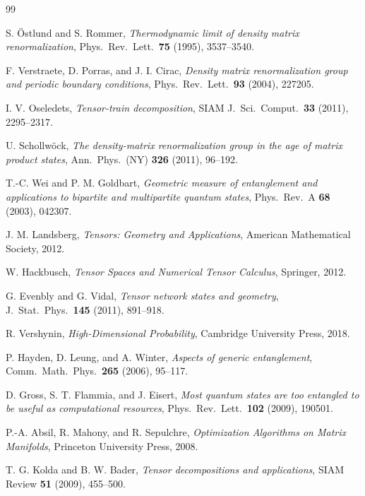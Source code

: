 \documentclass[11pt,letterpaper]{article}
\theoremstyle{definition}
\begin{document}
\begin{thebibliography}{99}

S. \"Ostlund and S. Rommer,
\emph{Thermodynamic limit of density matrix renormalization},
Phys.\ Rev.\ Lett.\ \textbf{75} (1995), 3537--3540.

F. Verstraete, D. Porras, and J. I. Cirac,
\emph{Density matrix renormalization group and periodic boundary conditions},
Phys.\ Rev.\ Lett.\ \textbf{93} (2004), 227205.

I. V. Oseledets,
\emph{Tensor-train decomposition},
SIAM J.\ Sci.\ Comput.\ \textbf{33} (2011), 2295--2317.

U. Schollw\"ock,
\emph{The density-matrix renormalization group in the age of matrix product
states},
Ann.\ Phys.\ (NY) \textbf{326} (2011), 96--192.

T.-C. Wei and P. M. Goldbart,
\emph{Geometric measure of entanglement and applications to bipartite and
multipartite quantum states},
Phys.\ Rev.\ A \textbf{68} (2003), 042307.

J. M. Landsberg,
\emph{Tensors: Geometry and Applications},
American Mathematical Society, 2012.

W. Hackbusch,
\emph{Tensor Spaces and Numerical Tensor Calculus},
Springer, 2012.

G. Evenbly and G. Vidal,
\emph{Tensor network states and geometry},
J.\ Stat.\ Phys.\ \textbf{145} (2011), 891--918.

R. Vershynin,
\emph{High-Dimensional Probability},
Cambridge University Press, 2018.

P. Hayden, D. Leung, and A. Winter,
\emph{Aspects of generic entanglement},
Comm.\ Math.\ Phys.\ \textbf{265} (2006), 95--117.

D. Gross, S. T. Flammia, and J. Eisert,
\emph{Most quantum states are too entangled to be useful as computational
resources},
Phys.\ Rev.\ Lett.\ \textbf{102} (2009), 190501.

P.-A. Absil, R. Mahony, and R. Sepulchre,
\emph{Optimization Algorithms on Matrix Manifolds},
Princeton University Press, 2008.

T. G. Kolda and B. W. Bader,
\emph{Tensor decompositions and applications},
SIAM Review \textbf{51} (2009), 455--500.

\end{thebibliography}
\end{document}
